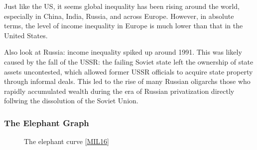 \documentclass[letterpaper,10pt,english]{jupyterBook}
\let\sphinxpxdimen\pdfpxdimen\else\newdimen\sphinxpxdimen
\begin{document}
\sphinxAtStartPar
Just like the US, it seems global inequality has been rising around the world, especially in China, India, Russia, and across Europe. However, in absolute terms, the level of income inequality in Europe is much lower than that in the United States.

\sphinxAtStartPar
Also look at Russia: income inequality spiked up around 1991. This was likely caused by the fall of the USSR: the failing Soviet state left the ownership of state assets uncontested, which allowed former USSR officials to acquire state property through informal deals. This led to the rise of many Russian oligarchs \sphinxhyphen{} those who rapidly accumulated wealth during the era of Russian privatization directly follwing the dissolution of the Soviet Union.

\begin{sphinxVerbatim}[commandchars=\\\{\}]
    
 
 
 
\end{sphinxVerbatim}

\noindent{}


\subsubsection{The Elephant Graph}
\label{\detokenize{content/06-inequality/historical-inequality:the-elephant-graph}}
\begin{figure}[htbp]
\centering
\capstart

\noindent\sphinxincludegraphics[width=500\sphinxpxdimen]{{elephant_curve}.jpg}
\caption{The elephant curve {[}\hyperlink{cite.content/references:id6}{MIL16}{]}}\label{\detokenize{content/06-inequality/historical-inequality:elephant-curve}}\end{figure}
\end{document}
